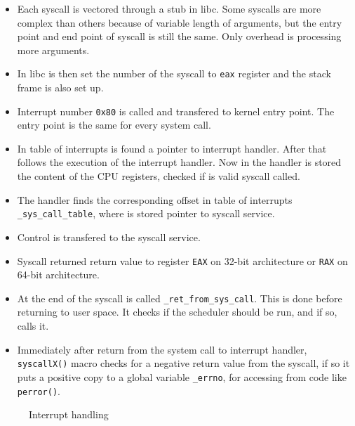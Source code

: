 \begin{itemize}
	\item Each syscall is vectored through a stub in libc. Some syscalls are more complex than others because of variable length of arguments, but the entry point and end point of syscall is still the same. Only overhead is processing more arguments.
	\item In libc is then set the number of the syscall to \texttt{eax} register and the stack frame is also set up.
	\item Interrupt number \texttt{0x80} is called and transfered to kernel entry point. The entry point is the same for every system call.
	\item In table of interrupts is found a pointer to interrupt handler. After that follows the execution of the interrupt handler. Now in the handler is stored the content of the CPU registers, checked if is valid syscall called.
	\item The handler finds the corresponding offset in table of interrupts \texttt{\_sys\_call\_table}, where is stored pointer to syscall service.
	\item Control is transfered to the syscall service.
	\item Syscall returned return value to register \texttt{EAX} on 32-bit architecture or \texttt{RAX} on 64-bit architecture.
	\item At the end of the syscall is called \texttt{\_ret\_from\_sys\_call\(\)}. This is done before returning to user space. It checks if the scheduler should be run, and if so, calls it.
	\item Immediately after return from the system call to interrupt handler, \texttt{syscallX()} macro checks for a negative return value from the syscall, if so it puts a positive copy to a global variable \texttt{\_errno}, for accessing from code like \texttt{perror()}.
\end{itemize}


\begin{figure}
  \center
  
  \caption{Interrupt handling}
  \label{fig:tikz:int_handling}
\end{figure}


% 


